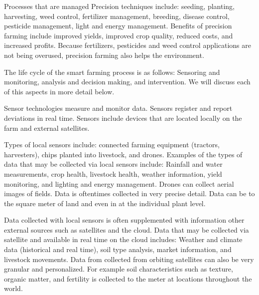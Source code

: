 \documentclass[sigconf]{acmart}
\begin{document}
Processes that are managed Precision techniques include: seeding, planting, harvesting, weed control, fertilizer management, breeding, disease control, pesticide management, light and energy management. Benefits of precision farming include improved yields, improved crop quality, reduced costs, and increased profits.  Because fertilizers, pesticides and weed control applications are not being overused, precision farming also helps the environment.

The life cycle of the smart farming process is as follows: Sensoring and monitoring, analysis and decision making, and intervention.  We will discuss each of this aspects in more detail below.

Sensor technologies measure and monitor data.  Sensors register and report deviations in real time. Sensors include devices that are located locally on the farm and external satellites. 

Types of local sensors include: connected farming equipment (tractors, harvesters), chips planted into livestock, and drones. Examples of the types of data that may be collected via local sensors include: Rainfall and water measurements, crop health, livestock health, weather information, yield monitoring, and lighting and energy management. Drones can collect aerial images of fields. Data is oftentimes collected in very precise detail. Data can be to the square meter of land and even in at the individual plant level. 

Data collected with local sensors is often supplemented with information other external sources such as satellites and the cloud. Data that may be collected via satellite and available in real time on the cloud includes: Weather and climate data (historical and real time), soil type analysis, market information, and livestock movements. Data from collected from orbiting satellites can also be very granular and personalized. For example soil characteristics such as texture, organic matter, and fertility is collected to the meter at locations throughout the world. 
\end{document}

